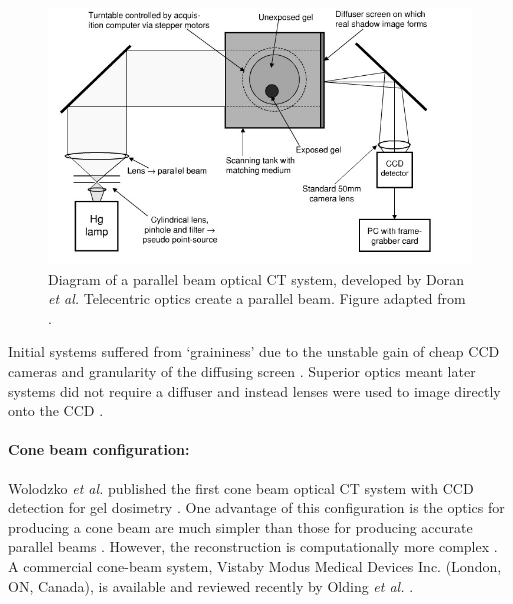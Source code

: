 	
	\begin{figure}[H]
		\centering
		\includegraphics[scale=0.55]{intro_img/Doran_2001_ccdsetup.jpg}
		\caption{Diagram of a parallel beam  optical CT system, developed by Doran \textit{et al.} Telecentric optics create a parallel beam.  Figure adapted from \cite{Doran:2001ee}. }
		\label{fig:doran_ccd_setup}
	\end{figure}
	
	
	
	Initial systems  suffered from `graininess' due to the unstable gain of cheap CCD cameras and granularity of the diffusing screen \cite{Doran:2001ee}. Superior optics meant later systems did not require a diffuser and instead lenses were used to image directly onto the CCD \cite{Krstajic:2006kna}.  
	
	
	
	
	
	
	
	\paragraph{Cone beam configuration:}
	Wolodzko \textit{et al.} published the first cone beam optical CT system with CCD detection for gel dosimetry \cite{Wolodzko:1999}. One advantage of this configuration is the optics for producing a cone beam are much simpler than those for producing accurate parallel beams \cite{Doran:2008kh}. However, the reconstruction is computationally more complex \cite{hsieh2003computed}. A commercial cone-beam system, Vista\texttrademark by Modus Medical Devices Inc. (London, ON, Canada),  is available and reviewed recently by Olding \textit{et al.} \cite{Olding:2011eta}.
	
